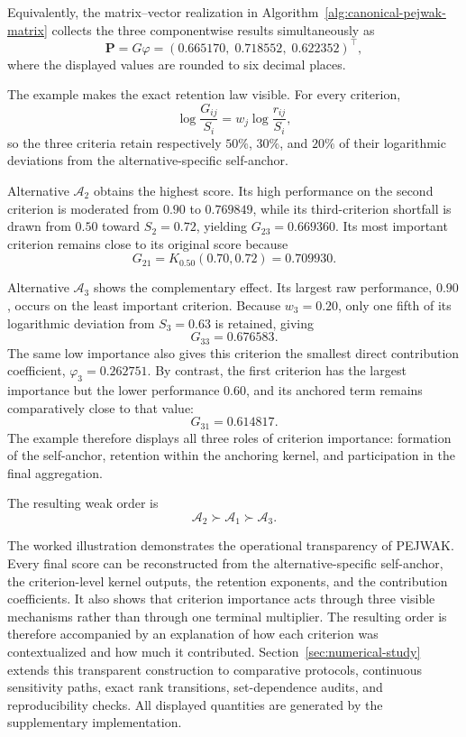 \documentclass[reqno,11pt]{amsart}
\theoremstyle{definition}
\theoremstyle{plain}
\theoremstyle{remark}
\begin{document}
Equivalently, the matrix--vector realization in
Algorithm~\ref{alg:canonical-pejwak-matrix} collects the three componentwise
results simultaneously as
\begin{equation*}
\mathbf P
=G\varphi
=
(0.665170,\;0.718552,\;0.622352)^\top,
\end{equation*}
where the displayed values are rounded to six decimal places.

The example makes the exact retention law visible. For every criterion,
\[
\log\frac{G_{ij}}{S_i}
=
w_j\log\frac{r_{ij}}{S_i},
\]
so the three criteria retain respectively \(50\%\), \(30\%\), and \(20\%\)
of their logarithmic deviations from the alternative-specific self-anchor.

Alternative \(\mathcal A_2\) obtains the highest score. Its high performance
on the second criterion is moderated from \(0.90\) to \(0.769849\), while its
third-criterion shortfall is drawn from \(0.50\) toward \(S_2=0.72\), yielding
\(G_{23}=0.669360\). Its most important criterion remains close to its original
score because
\[
G_{21}=K_{0.50}(0.70,0.72)=0.709930.
\]

Alternative \(\mathcal A_3\) shows the complementary effect. Its largest raw
performance, \(0.90\), occurs on the least important criterion. Because
\(w_3=0.20\), only one fifth of its logarithmic deviation from
\(S_3=0.63\) is retained, giving
\[
G_{33}=0.676583.
\]
The same low importance also gives this criterion the smallest direct
contribution coefficient, \(\varphi_3=0.262751\). By contrast, the first
criterion has the largest importance but the lower performance \(0.60\), and
its anchored term remains comparatively close to that value:
\[
G_{31}=0.614817.
\]
The example therefore displays all three roles of criterion importance:
formation of the self-anchor, retention within the anchoring kernel, and
participation in the final aggregation.

The resulting weak order is
\begin{equation*}
\boxed{
\mathcal A_2
\succ
\mathcal A_1
\succ
\mathcal A_3
}.
\end{equation*}

The worked illustration demonstrates the operational transparency of
PEJWAK. Every final score can be reconstructed from the
alternative-specific self-anchor, the criterion-level kernel outputs,
the retention exponents, and the contribution coefficients. It also
shows that criterion importance acts through three visible mechanisms
rather than through one terminal multiplier. The resulting order is
therefore accompanied by an explanation of how each criterion was
contextualized and how much it contributed. Section~\ref{sec:numerical-study}
extends this transparent construction to comparative protocols,
continuous sensitivity paths, exact rank transitions, set-dependence
audits, and reproducibility checks. All displayed quantities are
generated by the supplementary implementation.
\end{document}
